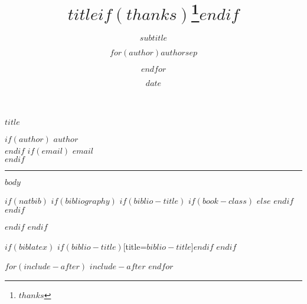 \documentclass[$if(fontsize)$$fontsize$,$endif$$if(lang)$$babel-lang$,$endif$$if(papersize)$$papersize$,$endif$$for(classoption)$$classoption$$sep$,$endfor$]{article}
\title{$title$$if(thanks)$\thanks{$thanks$}$endif$}
\subtitle{$subtitle$}
\author{$for(author)$$author$$sep$ \and $endfor$}
\date{$date$}
\begin{document}
\thispagestyle{firstpage} %
\pagestyle{regular} %

\begin{flushleft}
    \Large \sffamily \bfseries $title$
\end{flushleft}
\vspace{1mm}
$if(author)$
    {\large \sffamily $author$} \\
$endif$
$if(email)$
    \texttt{$email$} \\
$endif$

\hrule
\vspace{6mm}

$body$

$if(natbib)$
$if(bibliography)$
$if(biblio-title)$
$if(book-class)$
\renewcommand\bibname{$biblio-title$}
$else$
\renewcommand\refname{$biblio-title$}
$endif$
$endif$

$endif$
$endif$

$if(biblatex)$
\printbibliography$if(biblio-title)$[title=$biblio-title$]$endif$
$endif$

$for(include-after)$
$include-after$
$endfor$
\end{document}
